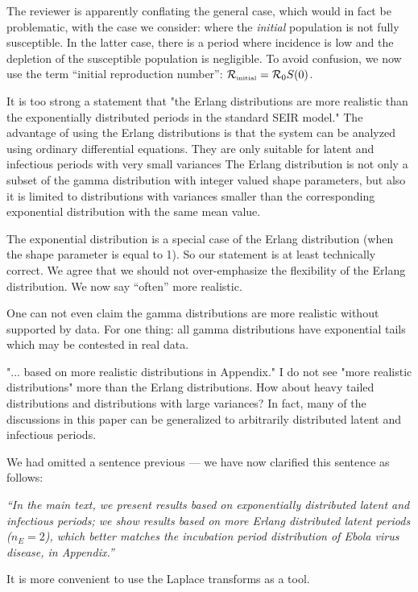 \documentclass[12pt]{article}
\newcommand{\Rx}[1]{\ensuremath{{\cal R}_{#1}}}
\newcommand{\Ro}{\Rx{0}}
\newcommand{\Rini}{\Rx{\textrm{\tiny initial}}}
\newcommand{\revtext}{\textsf}
\newcommand{\newtext}[1]{\textsl{``#1''}}
\begin{document}
The reviewer is apparently conflating the general case, which would in fact be problematic, with the case we consider: where the \emph{initial} population is not fully susceptible. In the latter case, there is a period where incidence is low and the depletion of the susceptible population is negligible.
To avoid confusion, we now use the term ``initial reproduction number'': $\Rini = \Ro S(0)$.

\revtext{
 It is too strong a statement that "the Erlang distributions are
more realistic than the exponentially distributed periods in the standard
SEIR model." The advantage of using the Erlang distributions is that the
system can be analyzed using ordinary differential equations. They are
only suitable for latent and infectious periods with very small variances
The Erlang distribution is not only a subset of the gamma distribution with integer valued shape parameters, but also it is limited to distributions with variances smaller than the corresponding exponential distribution with the same mean value.
}

The exponential distribution is a special case of the Erlang distribution (when the shape parameter is equal to 1). So our statement is at least technically correct.
We agree that we should not over-emphasize the flexibility of the Erlang distribution.
We now say ``often'' more realistic.

\revtext{
One can not even claim the gamma distributions are more realistic
without supported by data. For one thing: all gamma distributions
have exponential tails which may be contested in real data.
}

\revtext{
"... based on more realistic distributions in Appendix." I do
not see "more realistic distributions" more than the Erlang distributions.
How about heavy tailed distributions and distributions with large variances? In fact, many of the discussions in this paper can be generalized
to arbitrarily distributed latent and infectious periods.
}

We had omitted a sentence previous --- we have now clarified this sentence as follows:

\newtext{In the main text, we present results based on exponentially distributed latent and infectious periods;
we show results based on more Erlang distributed latent periods ($n_E=2$), which better matches the incubation period distribution of Ebola virus disease, in Appendix.}

\revtext{
It is more convenient to use the Laplace transforms as a tool.
}
\end{document}

